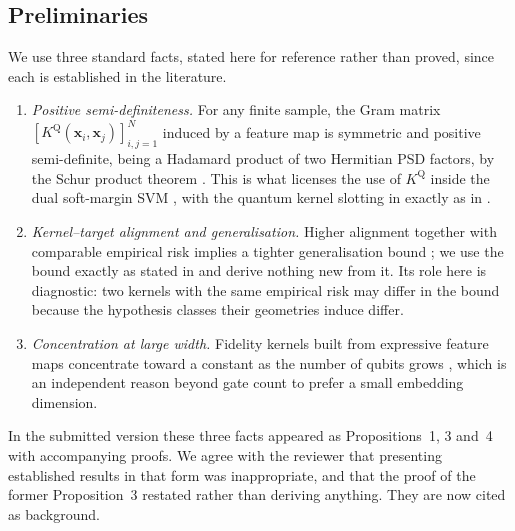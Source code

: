 \subsection{Preliminaries}
\begin{revbody}

We use three standard facts, stated here for reference rather than proved,
since each is established in the literature.

\begin{enumerate}
  \item[\textbf{(F1)}] \emph{Positive semi-definiteness.} For any finite sample,
    the Gram matrix $[K^{\mathrm{Q}}(\bm{x}_i,\bm{x}_j)]_{i,j=1}^{N}$ induced by
    a feature map is symmetric and positive semi-definite, being a Hadamard
    product of two Hermitian PSD factors, by the Schur product
    theorem \cite{scholkopf2002}. This is what licenses the use of
    $K^{\mathrm{Q}}$ inside the dual soft-margin SVM
    \cite{cortes1995,scholkopf2002}, with the quantum kernel slotting in exactly
    as in \cite{havlicek2019,schuld2019}.
  \item[\textbf{(F2)}] \emph{Kernel--target alignment and generalisation.}
    Higher alignment together with comparable empirical risk implies a tighter
    generalisation bound \cite{cristianini2002,cortes2012}; we use the bound
    exactly as stated in \cite{cortes2012} and derive nothing new from it. Its
    role here is diagnostic: two kernels with the same empirical risk may differ
    in the bound because the hypothesis classes their geometries induce differ.
  \item[\textbf{(F3)}] \emph{Concentration at large width.} Fidelity kernels
    built from expressive feature maps concentrate toward a constant as the
    number of qubits grows \cite{thanasilp2024}, which is an independent reason
    beyond gate count to prefer a small embedding dimension.
\end{enumerate}

\begin{remark}
In the submitted version these three facts appeared as Propositions~1, 3 and~4
with accompanying proofs. We agree with the reviewer that presenting established
results in that form was inappropriate, and that the proof of the former
Proposition~3 restated \cite{cortes2012} rather than deriving anything. They are
now cited as background.
\end{remark}


\end{revbody}
